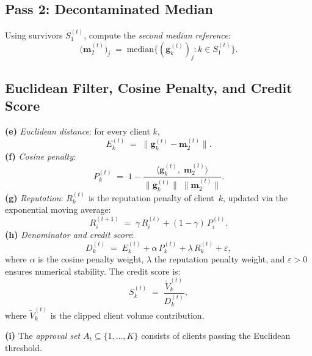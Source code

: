 \documentclass[../main]{subfiles}
\begin{document}
\subsection{Pass 2: Decontaminated Median}

Using survivors $S_1^{(t)}$, compute the \emph{second median reference}:
\begin{equation}
    \bigl(\mathbf{m}_2^{(t)}\bigr)_j \;=\; \mathrm{median}\bigl\{(\mathbf{g}_k^{(t)})_j : k \in S_1^{(t)}\bigr\}.
    \label{eq:second_median}
\end{equation}
\subsection{Euclidean Filter, Cosine Penalty, and Credit Score}

\textbf{(e)} \emph{Euclidean distance}: for every client $k$,
\begin{equation}
    E_k^{(t)} \;=\; \|\mathbf{g}_k^{(t)} - \mathbf{m}_2^{(t)}\|.
    \label{eq:euclidean_dist}
\end{equation}
\textbf{(f)} \emph{Cosine penalty}:
\begin{equation}
    P_k^{(t)} \;=\; 1 - \frac{\langle \mathbf{g}_k^{(t)},\; \mathbf{m}_2^{(t)}\rangle}
    {\|\mathbf{g}_k^{(t)}\|\;\|\mathbf{m}_2^{(t)}\|}.
    \label{eq:cosine_penalty}
\end{equation}
\textbf{(g)} \emph{Reputation}: $R_k^{(t)}$ is the reputation penalty of client~$k$, updated via the exponential moving average:
\begin{equation}
    R_i^{(t+1)} \;=\; \gamma\, R_i^{(t)} + (1 - \gamma)\, P_i^{(t)}.
    \label{eq:reputation_update}
\end{equation}
\textbf{(h)} \emph{Denominator and credit score}:
\begin{equation}
    D_k^{(t)} \;=\; E_k^{(t)} + \alpha\, P_k^{(t)} + \lambda\, R_k^{(t)} + \varepsilon,
\end{equation}
where $\alpha$ is the cosine penalty weight, $\lambda$ the reputation penalty weight, and $\varepsilon > 0$ ensures numerical stability. The credit score is:
\begin{equation}
    S_k^{(t)} \;=\; \frac{\widetilde{V}_k^{(t)}}{D_k^{(t)}},
\end{equation}
where $\widetilde{V}_k^{(t)}$ is the clipped client volume contribution.

\textbf{(i)} The \emph{approval set} $A_t \subseteq \{1, \ldots, K\}$ consists of clients passing the Euclidean threshold.
\end{document}
